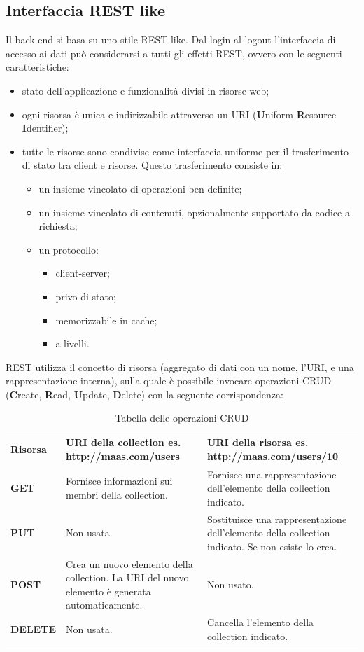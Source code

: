 \subsection{Interfaccia REST like}
Il back end si basa su uno stile REST like. Dal login al logout l'interfaccia di accesso ai dati può considerarsi a tutti gli effetti REST, ovvero con le seguenti caratteristiche:
\begin{itemize}
\item stato dell'applicazione e funzionalità divisi in risorse web;
\item ogni risorsa è unica e indirizzabile attraverso un URI (\textbf{U}niform \textbf{R}esource \textbf{I}dentifier);
\item tutte le risorse sono condivise come interfaccia uniforme per il trasferimento di stato tra client e risorse. Questo trasferimento consiste in:
\begin{itemize}
\item un insieme vincolato di operazioni ben definite;
\item un insieme vincolato di contenuti, opzionalmente supportato da codice a richiesta;
\item un protocollo:
\begin{itemize}
\item client-server;
\item privo di stato;
\item memorizzabile in cache;
\item a livelli.
\end{itemize}
\end{itemize}
\end{itemize}
REST utilizza il concetto di risorsa (aggregato di dati con un nome, l'URI, e una rappresentazione interna), sulla quale è possibile invocare operazioni CRUD (\textbf{C}reate, \textbf{R}ead, \textbf{U}pdate, \textbf{D}elete) con la seguente corrispondenza:
\begin{table}[H]
\centering
\label{CRUD}
\begin{tabular}{| >{\centering}p{3cm} | >{\centering}p{5cm} | >{\centering}p{6cm} |}
\hline
\textbf{Risorsa} & \textbf{URI della collection} \newline es. http://maas.com/users & \textbf{URI della risorsa} \newline es. http://maas.com/users/10 \tabularnewline \hline
\textbf{GET} & Fornisce informazioni sui membri della collection. & Fornisce una rappresentazione dell'elemento della collection indicato. \tabularnewline \hline
\textbf{PUT} & Non usata. & Sostituisce una rappresentazione dell'elemento della collection indicato. Se non esiste lo crea.  \tabularnewline \hline
\textbf{POST} & Crea un nuovo elemento della collection. La URI del nuovo elemento è generata automaticamente. & Non usato. \tabularnewline \hline
\textbf{DELETE} & Non usata. & Cancella l'elemento della collection indicato. \tabularnewline \hline
\end{tabular}
\caption{Tabella delle operazioni CRUD}
\end{table}
